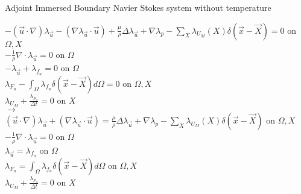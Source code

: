 \documentclass[10pt]{article} %
\begin{document}
\begin{center}
\begin{flushleft}
	Adjoint Immersed Boundary Navier Stokes system without temperature
\end{flushleft}
	$-(\vec{u}\cdot\nabla) \lambda_{\vec{u}} - \left(\nabla \lambda_{\vec{u}} \cdot \vec{u}\right) + \frac{\mu}{\rho} \Delta \lambda_{\vec{u}} + \nabla\lambda_p - \sum_X \lambda_{U_M}(X) \delta(\vec{x}-\vec{X}) = 0$ \quad on $\Omega,X$\\
	$-\frac{1}{\rho} \nabla \cdot \lambda_{\vec{u}} = 0$ \quad on $\Omega$\\
	$-\lambda_{\vec{u}} + \lambda_{f_u} = 0$ \quad on $\Omega$\\
	$\lambda_{F_u} - \int_{\Omega} \lambda_{f_u} \delta (\vec{x}-\vec{X}) d\Omega = 0$ \quad on $\Omega,X$\\
	$\lambda_{U_M} + \frac{\lambda_{F_u}}{\Delta t}=0$ \quad on $X$\\
	$\rightarrow$\\
	$(\vec{u}\cdot\nabla) \lambda_{\vec{u}} + \left(\nabla \lambda_{\vec{u}} \cdot \vec{u}\right) = \frac{\mu}{\rho} \Delta \lambda_{\vec{u}} + \nabla\lambda_p - \sum_X \lambda_{U_M}(X) \delta(\vec{x}-\vec{X})$ \quad on $\Omega,X$\\
	$-\frac{1}{\rho} \nabla \cdot \lambda_{\vec{u}} = 0$ \quad on $\Omega$\\
	$\lambda_{\vec{u}} = \lambda_{f_u} $ \quad on $\Omega$\\
	$\lambda_{F_u} = \int_{\Omega} \lambda_{f_u} \delta (\vec{x}-\vec{X}) d\Omega$ \quad on $\Omega,X$\\
	$\lambda_{U_M} + \frac{\lambda_{F_u}}{\Delta t}=0$ \quad on $X$\\


\end{center}
\end{document}
